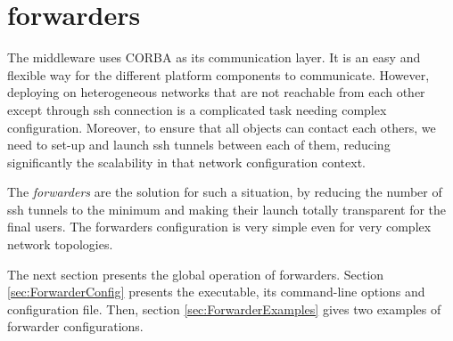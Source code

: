 \chapter{\diet forwarders}
\label{ch:forwarders}
The \diet middleware uses CORBA as its communication layer. It is an easy
and flexible way for the different platform components to communicate.
However, deploying \diet on heterogeneous networks that are not
reachable from each other except through ssh connection is a complicated
task needing complex configuration. Moreover, to ensure that all
objects can contact each others, we need to set-up and launch ssh
tunnels between each of them, reducing significantly the \diet
scalability in that network configuration context.

The \textit{\diet forwarders} are the solution for such a situation, by
reducing the number of ssh tunnels to the minimum and making their
launch totally transparent for the final users. The \diet forwarders
configuration is very simple even for very complex network topologies.

The next section presents the global operation of \diet
forwarders. Section \ref{sec:ForwarderConfig} presents the \dietforwarder
executable, its command-line options and configuration file. Then,
section \ref{sec:ForwarderExamples} gives two examples of forwarder
configurations.

